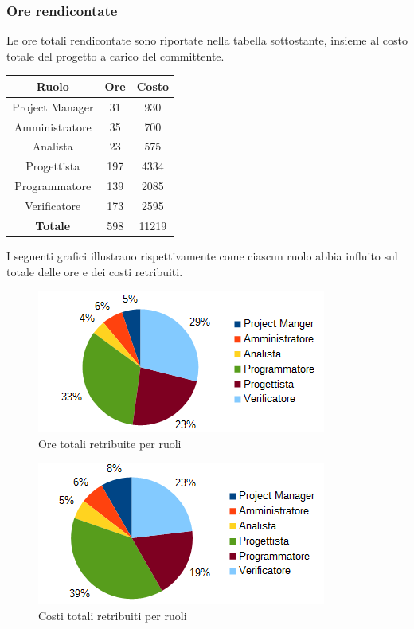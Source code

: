 		\subsubsection{Ore rendicontate}
		Le ore totali rendicontate sono riportate nella tabella sottostante, insieme al costo totale del progetto a carico del committente. \\
		\begin{table}[H]
		\centering
		\begin{tabular}{|c|c|c|}
			\hline
			\textbf{Ruolo}		& \textbf{Ore}	& \textbf{Costo} \\
			\hline
			Project Manager		& 31			& 930	\\
			Amministratore		& 35			& 700	\\
			Analista			& 23			& 575	\\
			Progettista			& 197			& 4334	\\
			Programmatore		& 139			& 2085	\\
			Verificatore		& 173			& 2595	\\
			\hline
			\textbf{Totale}		& 598			& 11219	\\
			\hline
		\end{tabular}
		\end{table}
		I seguenti grafici illustrano rispettivamente come ciascun ruolo abbia influito sul totale delle ore e dei costi retribuiti. \\
		\begin{figure}[H]
		\centering
			\includegraphics[scale=1]{immagini/grafici/orario_rendicontato-torta.png}
			\caption{Ore totali retribuite per ruoli}
		\end{figure}
		\begin{figure}[H]
			\centering
			\includegraphics[scale=1]{immagini/grafici/orario_rendicontato-torta-costo.png}
			\caption{Costi totali retribuiti per ruoli}
		\end{figure}

